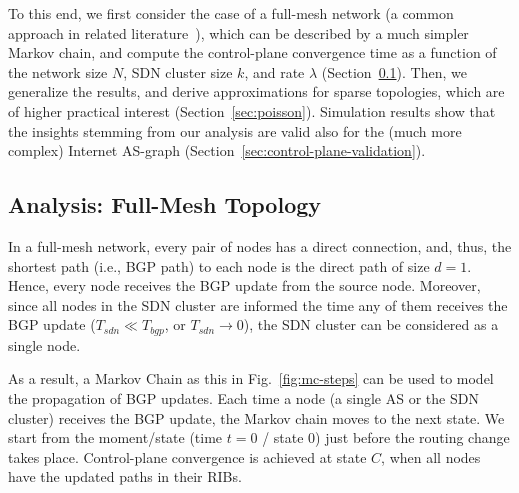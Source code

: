 
To this end, we first consider the case of a full-mesh network (a common approach in related literature~\cite{Kotronis-Routing-Centralization-ComNets-2015,Labozitz-Delayed-convergence-CCR-2000,convergence-properties-BGP_ComNets-2011}), which can be described by a much simpler Markov chain, and compute the control-plane convergence time as a function of the network size $N$, SDN cluster size $k$, and rate $\lambda$ (Section~\ref{sec:full-mesh}). Then, we generalize the results, and derive approximations for sparse topologies, which are of higher practical interest (Section~\ref{sec:poisson}). Simulation results show that the insights stemming from our analysis are valid also for the (much more complex) Internet AS-graph (Section~\ref{sec:control-plane-validation}).


\subsection{Analysis: Full-Mesh Topology}\label{sec:full-mesh}

In a full-mesh network, every pair of nodes has a direct connection, and, thus, the shortest path (i.e., BGP path) to each node is the direct path of size $d=1$. Hence, every node receives the BGP update from the source node. Moreover, since all nodes in the SDN cluster are informed the time any of them receives the BGP update ($T_{sdn}\ll T_{bgp}$, or $T_{sdn}\rightarrow 0$), the SDN cluster can be considered as a single node.

As a result, a Markov Chain as this in Fig.~\ref{fig:mc-steps} can be used to model the propagation of BGP updates. Each time a node (a single AS or the SDN cluster) receives the BGP update, the Markov chain moves to the next state. %
We start from the moment/state (time $t=0$ / state $0$) just before the routing change takes place. Control-plane convergence is achieved at state $C$, when all nodes have the updated paths in their RIBs. 

